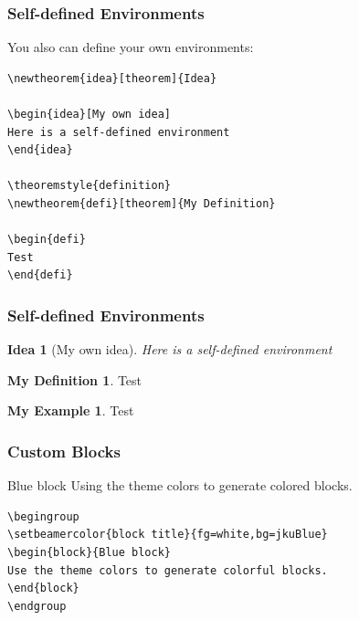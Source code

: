 \documentclass[utf8,aspectratio=169,ngerman,english]{beamer}
\begin{document}
\begin{frame}[fragile]
\frametitle{Self-defined Environments}

You also can define your own environments:
\begin{lstlisting}[language={[LaTeX]TeX},numbers=none]
\newtheorem{idea}[theorem]{Idea}

\begin{idea}[My own idea]
Here is a self-defined environment
\end{idea}

\theoremstyle{definition}
\newtheorem{defi}[theorem]{My Definition}

\begin{defi}
Test
\end{defi}
\end{lstlisting}
\end{frame}

\newtheorem{idea}[theorem]{Idea}
\theoremstyle{definition}
\newtheorem{defi}[theorem]{My Definition}
\theoremstyle{example}
\newtheorem{ex}[theorem]{My Example}

\begin{frame}[fragile]
\frametitle{Self-defined Environments}

\begin{idea}[My own idea]
Here is a self-defined environment
\end{idea}

\begin{defi}
Test
\end{defi}

\begin{ex}
Test
\end{ex}
\end{frame}


\begin{frame}[fragile]
\frametitle{Custom Blocks}
\begingroup
{}
\begin{block}{Blue block}
Using the theme colors to generate colored blocks.
\end{block}
\endgroup

\begin{lstlisting}[language={[LaTeX]TeX},numbers=none]
\begingroup
\setbeamercolor{block title}{fg=white,bg=jkuBlue}
\begin{block}{Blue block}
Use the theme colors to generate colorful blocks.
\end{block}
\endgroup
\end{lstlisting}
\end{frame}
\end{document}

